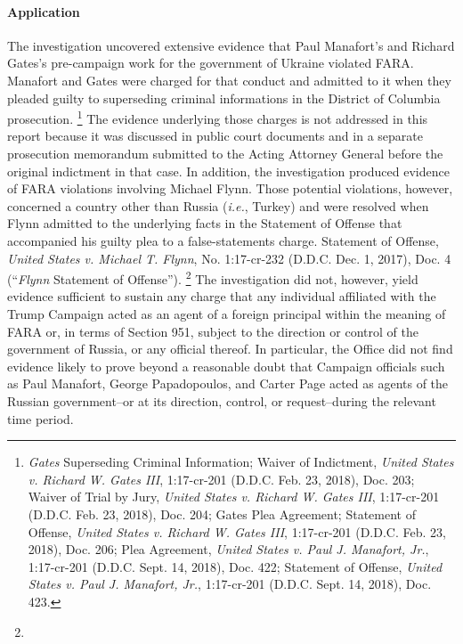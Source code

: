 \paragraph{Application}
The investigation uncovered extensive evidence that Paul Manafort's and Richard Gates's pre-campaign work for the government of Ukraine violated FARA.
Manafort and Gates were charged for that conduct and admitted to it when they pleaded guilty to superseding criminal informations in the District of Columbia prosecution.%
\footnote{\textit{Gates} Superseding Criminal Information;
Waiver of Indictment, \textit{United States v. Richard W. Gates III}, 1:17-cr-201 (D.D.C. Feb. 23, 2018), Doc. 203;
Waiver of Trial by Jury, \textit{United States v. Richard W. Gates III}, 1:17-cr-201 (D.D.C. Feb. 23, 2018), Doc. 204;
Gates Plea Agreement;
Statement of Offense, \textit{United States v. Richard W. Gates III}, 1:17-cr-201 (D.D.C. Feb. 23, 2018), Doc. 206;
Plea Agreement, \textit{United States v. Paul J. Manafort, Jr.}, 1:17-cr-201 (D.D.C. Sept. 14, 2018), Doc. 422;
Statement of Offense, \textit{United States v. Paul J. Manafort, Jr.}, 1:17-cr-201 (D.D.C. Sept. 14, 2018), Doc. 423.}
The evidence underlying those charges is not addressed in this report because it was discussed in public court documents and in a separate prosecution memorandum submitted to the Acting Attorney General before the original indictment in that case.
In addition, the investigation produced evidence of FARA violations involving Michael Flynn.
Those potential violations, however, concerned a country other than Russia (\textit{i.e.}, Turkey) and were resolved when Flynn admitted to the underlying facts in the Statement of Offense that accompanied his guilty plea to a false-statements charge.
Statement of Offense, \textit{United States v. Michael T. Flynn}, No. 1:17-cr-232 (D.D.C. Dec. 1, 2017), Doc. 4 (``\textit{Flynn} Statement of Offense'').%
\footnote{}
The investigation did not, however, yield evidence sufficient to sustain any charge that any individual affiliated with the Trump Campaign acted as an agent of a foreign principal within the meaning of FARA or, in terms of Section 951, subject to the direction or control of the government of Russia, or any official thereof.
In particular, the Office did not find evidence likely to prove beyond a reasonable doubt that Campaign officials such as Paul Manafort, George Papadopoulos, and Carter Page acted as agents of the Russian government--or at its direction, control, or request--during the relevant time period.%
